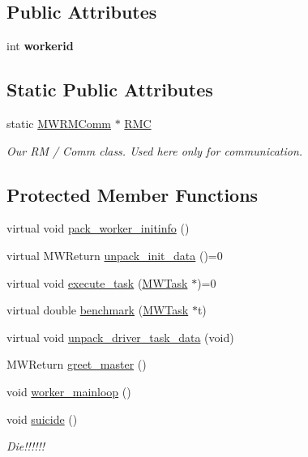 \subsection*{Public Attributes}
\begin{DoxyCompactItemize}
\item 
\mbox{\label{classMWWorker_a87f6c0b746b3bb065600a37a024bb27d}} 
int {\bfseries workerid}
\end{DoxyCompactItemize}
\subsection*{Static Public Attributes}
\begin{DoxyCompactItemize}
\item 
\mbox{\label{classMWWorker_ae5af340f99b0562ba20114c183d444f6}} 
static \hyperlink{classMWRMComm}{M\+W\+R\+M\+Comm} $\ast$ \hyperlink{classMWWorker_ae5af340f99b0562ba20114c183d444f6}{R\+MC}
\begin{DoxyCompactList}\small\item\em Our RM / Comm class. Used here only for communication. \end{DoxyCompactList}\end{DoxyCompactItemize}
\subsection*{Protected Member Functions}
\begin{DoxyCompactItemize}
\item 
virtual void \hyperlink{classMWWorker_a8a71e471b6376a829ea9ec716f723ae8}{pack\+\_\+worker\+\_\+initinfo} ()
\item 
virtual M\+W\+Return \hyperlink{classMWWorker_a3643c48f110d3f26e4d9aef00569d767}{unpack\+\_\+init\+\_\+data} ()=0
\item 
virtual void \hyperlink{classMWWorker_aa831917347c8f33026a75a5b8df94406}{execute\+\_\+task} (\hyperlink{classMWTask}{M\+W\+Task} $\ast$)=0
\item 
virtual double \hyperlink{classMWWorker_ad25d07ada482a0db02baa4ff1d8023e9}{benchmark} (\hyperlink{classMWTask}{M\+W\+Task} $\ast$t)
\item 
virtual void \hyperlink{classMWWorker_a2c5ef75df666407d7268f51a86143eb6}{unpack\+\_\+driver\+\_\+task\+\_\+data} (void)
\item 
M\+W\+Return \hyperlink{classMWWorker_a332479873153501e8ecb38cb682cdcd2}{greet\+\_\+master} ()
\item 
void \hyperlink{classMWWorker_a47f88c7a7c254d215174b77ab14bf5f3}{worker\+\_\+mainloop} ()
\item 
\mbox{\label{classMWWorker_a5b42e0d33adfc513fca36f7cb30ee38d}} 
void \hyperlink{classMWWorker_a5b42e0d33adfc513fca36f7cb30ee38d}{suicide} ()
\begin{DoxyCompactList}\small\item\em Die!!!!!! \end{DoxyCompactList}\end{DoxyCompactItemize}
